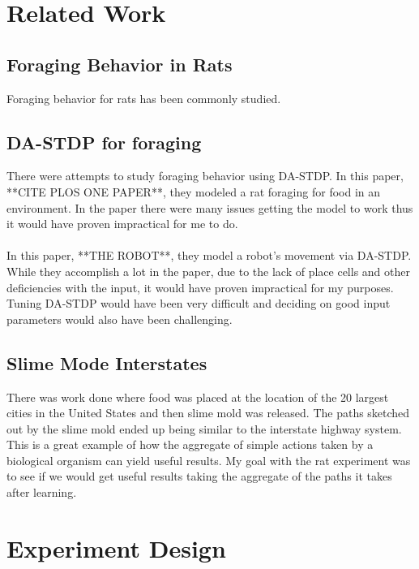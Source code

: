 \documentclass[conference]{IEEEtran}
\begin{document}
\section{Related Work}

\subsection{Foraging Behavior in Rats}
Foraging behavior for rats has been commonly studied.

\subsection{DA-STDP for foraging}

There were attempts to study foraging behavior using DA-STDP. In this paper, **CITE PLOS ONE PAPER**, they modeled a rat foraging for food in an environment. In the paper there were many issues getting the model to work thus it would have proven impractical for me to do. \\
\\
In this paper, **THE ROBOT**, they model a robot's movement via DA-STDP. While they accomplish a lot in the paper, due to the lack of place cells and other deficiencies with the input, it would have proven impractical for my purposes. Tuning DA-STDP would have been very difficult and deciding on good input parameters would also have been challenging. \\

\subsection{Slime Mode Interstates}

There was work done where food was placed at the location of the 20 largest cities in the United States and then slime mold was released. The paths sketched out by the slime mold ended up being similar to the interstate highway system. This is a great example of how the aggregate of simple actions taken by a biological organism can yield useful results. My goal with the rat experiment was to see if we would get useful results taking the aggregate of the paths it takes after learning. 


\section{Experiment Design}
\end{document}
